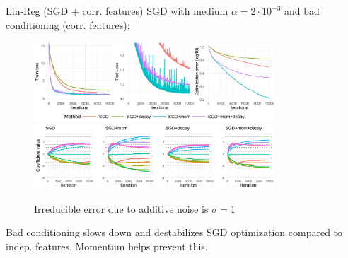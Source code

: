 \documentclass[11pt,compress,t,notes=noshow, xcolor=table]{beamer}
\begin{document}
\begin{vbframe}{Lin-Reg (SGD + corr. features)}
\vspace{-0.4cm}
SGD with medium $\alpha=2\cdot10^{-3}$ and bad conditioning (corr. features):
\begin{figure}
            \includegraphics[width=0.8\textwidth]{slides/04-multivariate-first-order/figure_man/simu_linmod/SGD_reg_med_lr_corr_iters.pdf} \\
             \includegraphics[width=0.8\textwidth]{slides/04-multivariate-first-order/figure_man/simu_linmod/SGD_reg_coef_med_corr.pdf}\\
            \begin{footnotesize}
                Irreducible error due to additive noise is $\sigma=1$
            \end{footnotesize}
\end{figure}
Bad conditioning slows down and destabilizes SGD optimization compared to indep. features. Momentum helps prevent this.
\end{vbframe}
\end{document}

